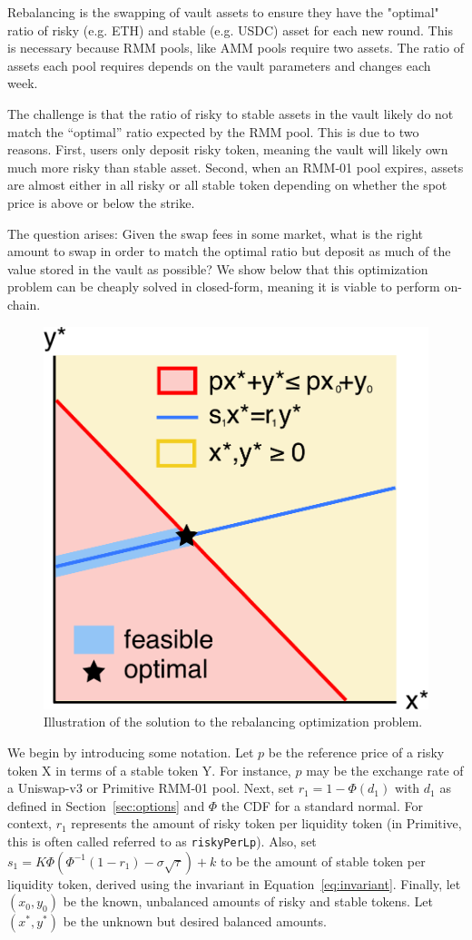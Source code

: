 \documentclass[hidelinks, 12pt]{article}
\begin{document}
Rebalancing is the swapping of vault assets to ensure they have the "optimal" ratio of risky (e.g. ETH) and stable (e.g. USDC) asset for each new round. This is necessary because RMM pools, like AMM pools require two assets. The ratio of assets each pool requires depends on the vault parameters and changes each week.

The challenge is that the ratio of risky to stable assets in the vault likely do not match the ``optimal'' ratio expected by the RMM pool.
This is due to two reasons.
First, users only deposit risky token, meaning the vault will likely own much more risky than stable asset.
Second, when an RMM-01 pool expires, assets are almost either in all risky or all stable token depending on whether the spot price is above or below the strike.

The question arises: Given the swap fees in some market, what is the right amount to swap in order to match the optimal ratio but deposit as much of the value stored in the vault as possible? We show below that this optimization problem can be cheaply solved in closed-form, meaning it is viable to perform on-chain.

\begin{figure}[h!]
    \centering
    \includegraphics[width=0.5\linewidth]{rebalance.pdf}
    \caption{Illustration of the solution to the rebalancing optimization problem.}
    \label{fig:rebalance}
\end{figure}

We begin by introducing some notation. Let $p$ be the reference price of a risky token X in terms of a stable token Y. For instance, $p$ may be the exchange rate of a Uniswap-v3 or Primitive RMM-01 pool. Next, set $r_1 = 1 - \Phi(d_1)$ with $d_1$ as defined in Section~\ref{sec:options} and $\Phi$ the CDF for a standard normal. For context, $r_1$ represents the amount of risky token per liquidity token (in Primitive, this is often called referred to as \texttt{riskyPerLp}). Also, set $s_1 = K\Phi(\Phi^{-1}(1-r_1)-\sigma\sqrt{\tau}) + k$ to be the amount of stable token per liquidity token, derived using the invariant in Equation~\ref{eq:invariant}. Finally, let $(x_0, y_0)$ be the known, unbalanced  amounts of risky and stable tokens. Let $(x^*, y^*)$ be the unknown but desired balanced amounts.
\end{document}
